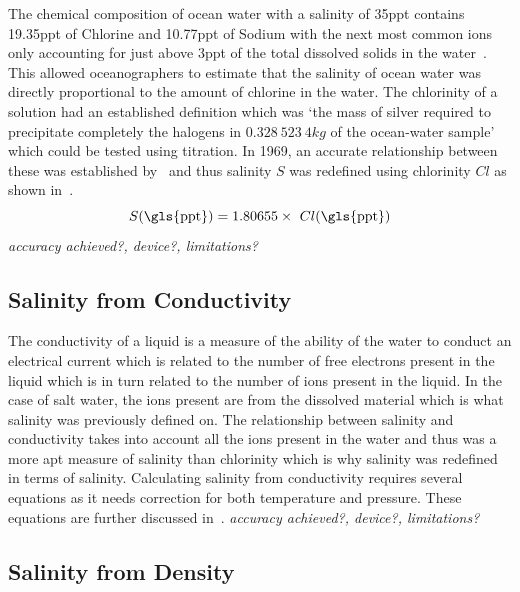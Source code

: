 The chemical composition of ocean water with a salinity of 35\gls{ppt} contains 19.35\gls{ppt} of Chlorine and 10.77\gls{ppt} of Sodium with the next most common ions only accounting for just above 3\gls{ppt} of the total dissolved solids in the water~\cite{britannica_seawater_encyclopaedia_2024}.
This allowed oceanographers to estimate that the salinity of ocean water was directly proportional to the amount of chlorine in the water.
The chlorinity of a solution had an established definition which was `the mass of silver required to precipitate completely the halogens in $0.328\ 523\ 4 kg$ of the ocean-water sample'~\cite{wooster_redefinition_of_salinity_1969} which could be tested using titration.
In 1969, an accurate relationship between these was established by~ and thus salinity $S$ was redefined using chlorinity $Cl$ as shown in~.
\begin{equation}\label{eqn:salinity-chlorinity}
    S (\text{\gls{ppt}}) = 1.80655 \times~Cl (\text{\gls{ppt}})
\end{equation}
\textit{accuracy achieved?, device?, limitations?}

\subsection{Salinity from Conductivity}\label{subsec:salinity-from-conductivity}

The conductivity of a liquid is a measure of the ability of the water to conduct an electrical current which is related to the number of free electrons present in the liquid which is in turn related to the number of ions present in the liquid.
In the case of salt water, the ions present are from the dissolved material which is what salinity was previously defined on.
The relationship between salinity and conductivity takes into account all the ions present in the water and thus was a more apt measure of salinity than chlorinity which is why salinity was redefined in terms of salinity.
Calculating salinity from conductivity requires several equations as it needs correction for both temperature and pressure. 
These equations are further discussed in~.
\textit{accuracy achieved?, device?, limitations?}

\subsection{Salinity from Density}

